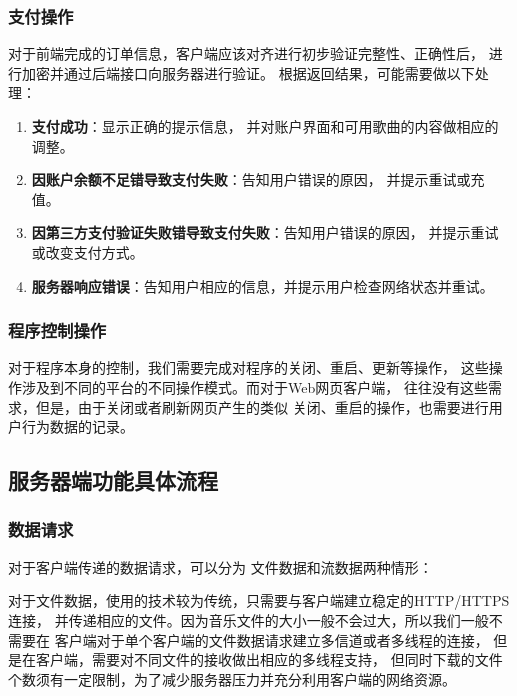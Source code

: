 \subsubsection{支付操作} %
\label{ssub:支付操作}
对于前端完成的订单信息，客户端应该对齐进行初步验证完整性、正确性后，
进行加密并通过后端接口向服务器进行验证。
根据返回结果，可能需要做以下处理：
\begin{enumerate}
    \item \textbf{支付成功}：显示正确的提示信息，
        并对账户界面和可用歌曲的内容做相应的调整。
    \item \textbf{因账户余额不足错导致支付失败}：告知用户错误的原因，
        并提示重试或充值。
    \item \textbf{因第三方支付验证失败错导致支付失败}：告知用户错误的原因，
        并提示重试或改变支付方式。
    \item \textbf{服务器响应错误}：告知用户相应的信息，并提示用户检查网络状态并重试。
\end{enumerate}

\subsubsection{程序控制操作} %
\label{ssub:程序控制操作}
对于程序本身的控制，我们需要完成对程序的关闭、重启、更新等操作，
这些操作涉及到不同的平台的不同操作模式。而对于Web网页客户端，
往往没有这些需求，但是，由于关闭或者刷新网页产生的类似
关闭、重启的操作，也需要进行用户行为数据的记录。

\subsection{服务器端功能具体流程}
\subsubsection{数据请求} %
\label{ssub:数据请求}
对于客户端传递的数据请求，可以分为
文件数据和流数据两种情形：

对于文件数据，使用的技术较为传统，只需要与客户端建立稳定的HTTP/HTTPS连接，
并传递相应的文件。因为音乐文件的大小一般不会过大，所以我们一般不需要在
客户端对于单个客户端的文件数据请求建立多信道或者多线程的连接，
但是在客户端，需要对不同文件的接收做出相应的多线程支持，
但同时下载的文件个数须有一定限制，为了减少服务器压力并充分利用客户端的网络资源。

